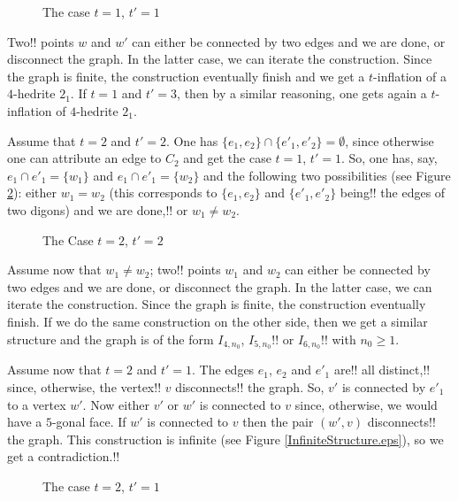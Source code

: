 \documentclass[12pt]{article}
\begin{document}
\begin{figure}
\centering
\epsfxsize=40mm
\caption{The case $t=1$, $t'=1$}
\label{fig:Case33}
\end{figure}

Two!! points $w$ and $w'$ can either be connected by two edges and
we are done, or disconnect the graph. In the latter case, we can iterate
the construction. Since the graph is finite, the construction eventually
finish and we get a $t$-inflation of a $4$-hedrite $2_1$. If $t=1$ and
$t'=3$, then by a similar reasoning, one gets again a $t$-inflation of
$4$-hedrite $2_1$.

Assume that $t=2$ and $t'=2$. One has $\{e_1, e_2\}\cap \{e'_1, e'_2\}=\emptyset$, since otherwise one can attribute an edge to $C_2$ and get the case $t=1$, $t'=1$. So, one has, say, $e_1\cap e'_1=\{w_1\}$ and $e_1\cap e'_1=\{w_2\}$ and the following two possibilities (see Figure \ref{fig:AllThreeCases}): either $w_1=w_2$ (this corresponds to $\{e_1, e_2\}$ and $\{e'_1, e'_2\}$ being!! the edges of two digons) and we are done,!! or $w_1\not= w_2$.
\begin{figure}
\centering
\epsfxsize=40mm
\caption{The Case $t=2$, $t'=2$}
\label{fig:AllThreeCases}
\end{figure}

Assume now that $w_1\not= w_2$; two!! points $w_1$ and $w_2$ can 
either be connected by two edges and we are done, or disconnect the
graph. In the latter case, we can iterate the construction. Since the 
graph is finite, the construction eventually finish. If we do the same
construction on the other side, then we get a similar structure and the 
graph is of the form $I_{4,n_0}$, $I_{5, n_0}$!! 
or $I_{6,n_0}$!! with $n_0\geq 1$.


Assume now that $t=2$ and $t'=1$. The edges $e_1$, $e_2$ and $e'_1$ are!! all distinct,!! since, otherwise, the vertex!! $v$ 
disconnects!! the graph.
So, $v'$ is connected by $e'_1$ to a vertex $w'$. Now either $v'$ or $w'$
is connected to $v$ since, otherwise, we would have a $5$-gonal face.
If $w'$ is connected to $v$ then the pair $(w', v)$ disconnects!! the graph.
This construction is infinite (see Figure \ref{InfiniteStructure.eps}), so
we get a contradiction.!!

\begin{figure}
\centering
\epsfxsize=40mm
\caption{The case $t=2$, $t'=1$}
\label{fig:Infinite structure}
\end{figure}
\end{document}
